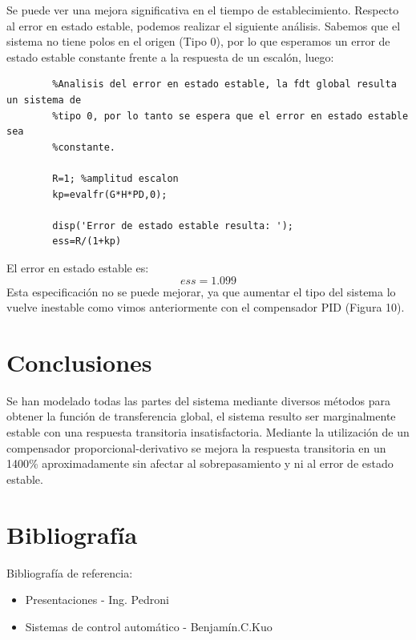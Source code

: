 \documentclass[12pt]{article}
\begin{document}
	Se puede ver una mejora significativa en el tiempo de establecimiento. Respecto al error en estado estable, podemos realizar el siguiente análisis. Sabemos que el sistema no tiene polos en el origen (Tipo 0), por lo que esperamos un error de estado estable constante frente a la respuesta de un escalón, luego:
	
	\begin{lstlisting}
		%Analisis del error en estado estable, la fdt global resulta un sistema de
		%tipo 0, por lo tanto se espera que el error en estado estable sea
		%constante.
		
		R=1; %amplitud escalon
		kp=evalfr(G*H*PD,0);
		
		disp('Error de estado estable resulta: ');
		ess=R/(1+kp)
	\end{lstlisting}
	
	El error en estado estable es:
	\begin{equation}
		ess=1.099
	\end{equation}
	Esta especificación no se puede mejorar, ya que aumentar el tipo del sistema lo vuelve inestable como vimos anteriormente con el compensador PID (Figura 10).\newpage
	
\section{Conclusiones}
	Se han modelado todas las partes del sistema mediante diversos métodos para obtener la función de transferencia global, el sistema resulto ser marginalmente estable con una respuesta transitoria insatisfactoria. Mediante la utilización de un compensador proporcional-derivativo se mejora la respuesta transitoria en un 1400\% aproximadamente sin afectar al sobrepasamiento y ni al error de estado estable.
\newpage
\section{Bibliografía}
	Bibliografía de referencia:
	\begin{itemize}
		\item Presentaciones - Ing. Pedroni
		\item Sistemas de control automático - Benjamín.C.Kuo
	\end{itemize}
\end{document}
